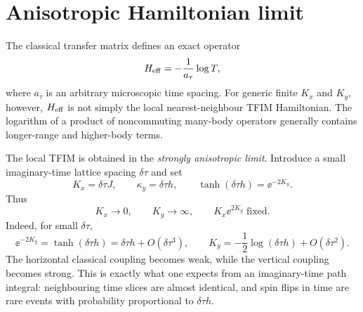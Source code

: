 \section{Anisotropic Hamiltonian limit}
\label{sec:ising-tfim-anisotropic-limit}

The classical transfer matrix defines an exact operator
\begin{equation}
\label{eq:ising-tfim-exact-effective-hamiltonian}
    H_{\rm eff}
    =
    -\frac{1}{a_\tau}\log T,
\end{equation}
where $a_\tau$ is an arbitrary microscopic time spacing.  For generic finite
$K_x$ and $K_y$, however, $H_{\rm eff}$ is not simply the local nearest-neighbour
TFIM Hamiltonian.  The logarithm of a product of noncommuting many-body
operators generally contains longer-range and higher-body terms.

The local TFIM is obtained in the \emph{strongly anisotropic limit}.  Introduce a
small imaginary-time lattice spacing $\delta\tau$ and set
\begin{equation}
\label{eq:ising-tfim-anisotropic-scaling}
    K_x=\delta\tau J,
    \qquad
    \kappa_y=\delta\tau h,
    \qquad
    \tanh(\delta\tau h)=\ee^{-2K_y} .
\end{equation}
Thus
\begin{equation}
\label{eq:ising-tfim-strong-anisotropy}
    K_x\to0,
    \qquad
    K_y\to\infty,
    \qquad
    K_x\ee^{2K_y}\;\text{fixed}.
\end{equation}
Indeed, for small $\delta\tau$,
\begin{equation}
\label{eq:ising-tfim-ky-asymptotic}
    \ee^{-2K_y}
    =
    \tanh(\delta\tau h)
    =
    \delta\tau h+O(\delta\tau^3),
    \qquad
    K_y
    =
    -\frac12\log(\delta\tau h)+O(\delta\tau^2).
\end{equation}
The horizontal classical coupling becomes weak, while the vertical coupling
becomes strong.  This is exactly what one expects from an imaginary-time path
integral: neighbouring time slices are almost identical, and spin flips in time
are rare events with probability proportional to $\delta\tau h$.

